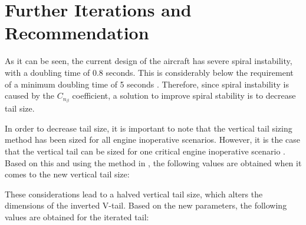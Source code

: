\section{Further Iterations and Recommendation}
\label{sec:Further_Iterations_and_Recommendation}

As it can be seen, the current design of the aircraft has severe spiral instability, with a doubling time of 0.8 seconds.
This is considerably below the requirement of a minimum doubling time of 5 seconds \cite{cook2012flight}.
Therefore, since spiral instability is caused by the $C_{n{_{\beta}}}$ coefficient, a solution to improve spiral stability is to decrease tail size.

In order to decrease tail size, it is important to note that the vertical tail sizing method has been sized for all engine inoperative scenarios. However, it is the case that the vertical tail can be sized for one critical engine inoperative scenario \cite{nicolosi2017comprehensive}.
Based on this and using the method in , the following values are obtained when it comes to the new vertical tail size:
\begin{table}[H]
    \centering
    \caption{Iterated values required to determine the vertical tail size for engine inoperative}
    \label{tab:vert_control_iterate}
\end{table}
These considerations lead to a halved vertical tail size, which alters the dimensions of the inverted V-tail. Based on the new parameters, the following values are obtained for the iterated tail:
\begin{table}[H]
    \centering
    \caption{Iterated tail parameters}
    \label{tab:Iterated_Tail_Parameters}
\end{table}

